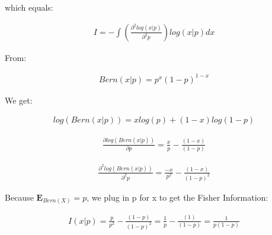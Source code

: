\documentclass[10pt]{article}
\begin{document}
\begin{itemize}
which equals:

\begin{align*}
    I =
    -\int (\frac{\partial^2log(x|p)}{\partial^2p})log(x|p)dx
\end{align*}

From:

\begin{align*}
    Bern(x|p) =
    p^x(1-p)^{1-x}
\end{align*}

We get:

\begin{align*}
    log(Bern(x|p)) = xlog(p) + (1-x)log(1-p)
\end{align*}

\begin{align*}
    \frac{\partial log(Bern(x|p))}{\partial p} = \frac{x}{p} - \frac{(1-x)}{(1-p)}
\end{align*}

\begin{align*}
    \frac{\partial^2 log(Bern(x|p))}{\partial^2 p} = \frac{-x}{p^2} - \frac{(1-x)}{(1-p)^2}
\end{align*}

Because $\mathbf{E}_{Bern(X)} = p$, we plug in p for x to get the Fisher Information:

\begin{align*}
    I(x|p) = 
    \frac{p}{p^2} - \frac{(1-p)}{(1-p)^2} =
    \frac{1}{p} - \frac{(1)}{(1-p)} =
    \frac{1}{p(1-p)}
\end{align*}

\end{itemize}
\end{document}
